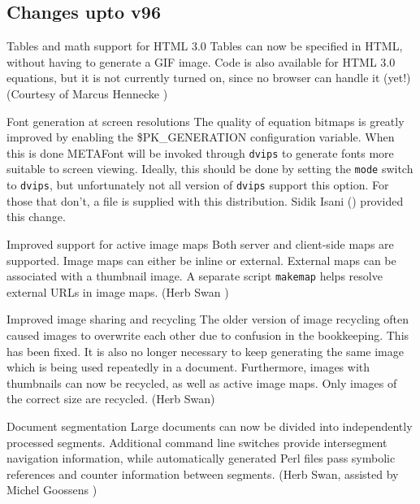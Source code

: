 \subsection{Changes upto v96}
\begin{htmllist}
\item[Tables and math support for HTML 3.0]
Tables can now be specified in HTML, without having to generate a
GIF image.  Code is also available for HTML 3.0 equations, but it is not
currently turned on, since no browser can handle it (yet!)
(Courtesy of Marcus Hennecke )

\item[Font generation at screen resolutions]
The quality of equation bitmaps is greatly improved by enabling the
\$PK\_GENERATION configuration variable.  When this is done
METAFont will be invoked through \texttt{dvips} to generate fonts
more suitable to screen viewing.  Ideally, this should be done
by setting the \texttt{mode} switch to \texttt{dvips}, but unfortunately
not all version of \texttt{dvips} support this option.  For those
that don't, a  file is supplied with this distribution.
Sidik Isani () provided this 
change.

\item[Improved support for active image maps]
Both server and client-side maps are supported.  Image maps can
either be inline or external.  External maps can be associated
with a thumbnail image.  A separate script \texttt{makemap} helps
resolve external URLs in image maps.  (Herb Swan )

\item[Improved image sharing and recycling]
The older version of image recycling often caused images to
overwrite each other due to confusion in the bookkeeping.
This has been fixed.  It is also no longer necessary to keep
generating the same image which is being used repeatedly in a
document.  Furthermore, images with thumbnails can now be
recycled, as well as active image maps.  Only images of the
correct size are recycled.  (Herb Swan)

\item[Document segmentation]
Large documents can now be divided into independently processed
segments.  Additional command line switches provide intersegment
navigation information, while automatically generated Perl
files pass symbolic references and counter information
between segments.  (Herb Swan, assisted by Michel Goossens
)


\end{htmllist}
